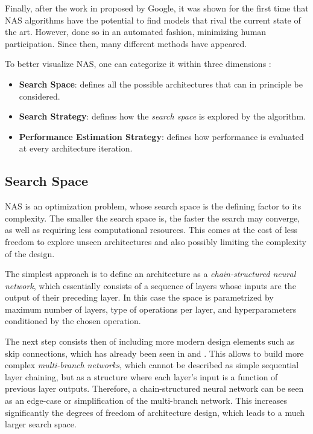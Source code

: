 \documentclass[10pt,        %
               a4paper,     %
               journal,     %
               ]{IEEEtran}
\begin{document}
Finally, after the work in \cite{zoph2016neural} proposed by Google, it was shown for the first time that NAS algorithms
have the potential to find models that rival the current state of the art. However, done so in an automated fashion, minimizing
human participation. Since then, many different methods have appeared.

To better visualize NAS, one can categorize it within three dimensions \cite{wistuba2019survey}:
\begin{itemize}
    \item \textbf{Search Space}: defines all the possible architectures that can in principle be considered.

    \item \textbf{Search Strategy}: defines how the \textit{search space} is explored by the algorithm.

    \item \textbf{Performance Estimation Strategy}: defines how performance is evaluated at every architecture iteration.
\end{itemize}

\subsection{Search Space}
NAS is an optimization problem, whose search space is the defining factor to its complexity.
The smaller the search space is, the faster the search may converge,
as well as requiring less computational resources. This comes at the cost of less freedom to
explore unseen architectures and also possibly limiting the complexity of the design.

The simplest approach is to define an architecture as a \textit{chain-structured neural network}, which essentially consists of a
sequence of layers whose inputs are the output of their preceding layer. In this case the space is parametrized by maximum number
of layers, type of operations per layer, and hyperparameters conditioned by the chosen operation.

The next step consists then of including more modern design elements such as skip connections, which has already been seen
in \cite{zoph2016neural} and \cite{pmlr-v70-real17a}. This allows to build more complex \textit{multi-branch networks}, which
cannot be described as simple sequential layer chaining, but as a structure where each layer's input is a function of
previous layer outputs. Therefore, a chain-structured neural network can be seen as an edge-case or simplification of the multi-branch network.
This increases significantly the degrees of freedom of architecture design, which leads to a much larger search space.
\end{document}
